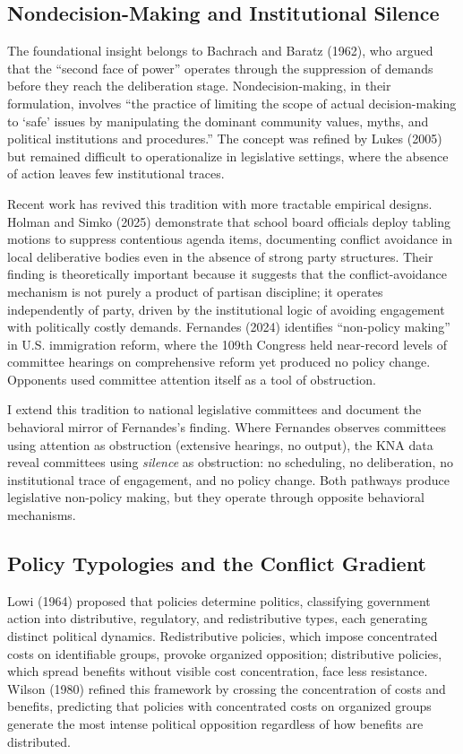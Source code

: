 \documentclass[11pt]{article}
\begin{document}
\subsection{Nondecision-Making and Institutional Silence}

The foundational insight belongs to Bachrach and Baratz (1962), who argued that the ``second face of power'' operates through the suppression of demands before they reach the deliberation stage. Nondecision-making, in their formulation, involves ``the practice of limiting the scope of actual decision-making to `safe' issues by manipulating the dominant community values, myths, and political institutions and procedures.'' The concept was refined by Lukes (2005) but remained difficult to operationalize in legislative settings, where the absence of action leaves few institutional traces.

Recent work has revived this tradition with more tractable empirical designs. Holman and Simko (2025) demonstrate that school board officials deploy tabling motions to suppress contentious agenda items, documenting conflict avoidance in local deliberative bodies even in the absence of strong party structures. Their finding is theoretically important because it suggests that the conflict-avoidance mechanism is not purely a product of partisan discipline; it operates independently of party, driven by the institutional logic of avoiding engagement with politically costly demands. Fernandes (2024) identifies ``non-policy making'' in U.S. immigration reform, where the 109th Congress held near-record levels of committee hearings on comprehensive reform yet produced no policy change. Opponents used committee attention itself as a tool of obstruction.

I extend this tradition to national legislative committees and document the behavioral mirror of Fernandes's finding. Where Fernandes observes committees using attention as obstruction (extensive hearings, no output), the KNA data reveal committees using \textit{silence} as obstruction: no scheduling, no deliberation, no institutional trace of engagement, and no policy change. Both pathways produce legislative non-policy making, but they operate through opposite behavioral mechanisms.

\subsection{Policy Typologies and the Conflict Gradient}

Lowi (1964) proposed that policies determine politics, classifying government action into distributive, regulatory, and redistributive types, each generating distinct political dynamics. Redistributive policies, which impose concentrated costs on identifiable groups, provoke organized opposition; distributive policies, which spread benefits without visible cost concentration, face less resistance. Wilson (1980) refined this framework by crossing the concentration of costs and benefits, predicting that policies with concentrated costs on organized groups generate the most intense political opposition regardless of how benefits are distributed.
\end{document}
